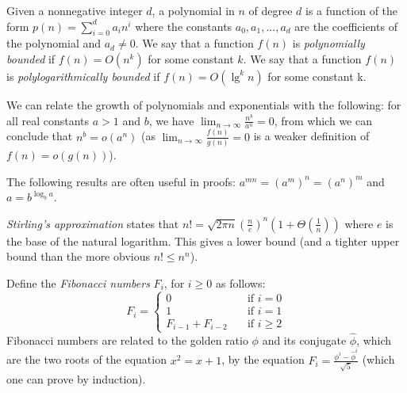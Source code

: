 \documentclass[12pt]{article}
\begin{document}
Given a nonnegative integer $d$, a polynomial in $n$ of degree $d$ is a function of the form $p(n) = \sum_{i = 0}^{d}a_in^i$
where the constants $a_0, a_1, ..., a_d$ are the coefficients of the polynomial and $a_d \neq 0$. We say that
a function $f(n)$ is \textit{polynomially bounded} if $f(n) = O(n^k)$ for some constant $k$. We say that a function $f(n)$
is \textit{polylogarithmically bounded} if $f(n) = O(\lg^kn)$ for some constant k.

We can relate the growth of polynomials and exponentials with the following: for all real constants $a > 1$ and $b$, we have
$\displaystyle \lim_{n\to\infty}\frac{n^b}{a^n} = 0$, from which we can conclude that $n^b = o(a^n)$
(as $\displaystyle\lim_{n\to\infty}\frac{f(n)}{g(n)} = 0$ is a weaker definition of $f(n) = o(g(n))$).

The following results are often useful in proofs: $a^{mn} = (a^m)^n = (a^n)^m$ and $a = b^{\log_{b}a}$.

\textit{Stirling's approximation} states that $n! = \sqrt{2\pi n}\left(\frac{n}{e}\right)^n(1 + \Theta\left(\frac{1}{n}\right))$
where $e$ is the base of the natural logarithm. This gives a lower bound (and a tighter upper bound than the
more obvious $n! \leq n^n$).

Define the \textit{Fibonacci numbers} $F_i$, for $i \geq 0$ as follows:
\[ F_i =
  \begin{cases}
    0 & \quad \text{if } i = 0\\
    1 & \quad \text{if } i = 1\\
    F_{i - 1} + F_{i - 2} & \quad \text{if } i \geq 2
  \end{cases}
\]
Fibonacci numbers are related to the golden ratio $\phi$ and its conjugate $\hat{\phi}$, which are
the two roots of the equation $x^2= x + 1$, by the equation $F_i= \frac{\phi^i - \hat{\phi}^i}{\sqrt{5}}$ (which
one can prove by induction).
\end{document}
